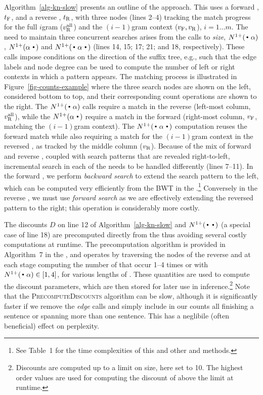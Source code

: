 Algorithm~\ref{alg-kn-slow} presents an outline of the approach.
This uses a forward \CST, $t_{\text{F}}$, and a reverse \CST, $t_{\text{R}}$, with three \CST nodes (lines 2--4) tracking the match progress for the full $i$gram ($v_{\text{R}}^{\text{all}}$) and the $(i-1)$gram context ($v_{\text{F}}, v_{\text{R}}$), $i=1 \ldots m$.
The need to maintain three concurrent searches arises from the calls to \emph{size}, $\nlplus{\dotpat}$, $\nlplus{\patdot}$ and $\nlplus{\dotpatdot}$ (lines 14, 15; 17; 21; and 18, respectively).
These calls impose conditions on the direction of the suffix tree, e.g., such that the edge 
labels and node degree can be used to compute the number of left or right contexts in which a pattern appears. 
The matching process is illustrated in Figure~\ref{fig-counts-example} where the three search nodes are shown on the left, considered bottom to top, and their corresponding count operations are shown to the right.
The $\nlplus{\dotpat}$ calls require a match in the reverse \CST (left-most column, $v_{\text{R}}^{\text{all}}$), while the $\nlplus{\patdot}$ require a match in the forward \CST (right-most column, $v_{\text{F}}$, matching the $(i-1)$gram context). 
The $\nlplus{\dotpatdot}$ computation reuses the forward match while also requiring a match for the $(i-1)$gram context in the reversed \CST, as tracked by the middle column ($v_{\text{R}}$).
Because of the mix of forward and reverse \CSTs, coupled with search patterns that are revealed right-to-left, incremental search in each of the \CSTs needs to be handled differently (lines 7--11).
In the forward \CST, we perform \emph{backward search} to extend the search pattern to the left, which can be computed very efficiently from the BWT in the \CSA.\footnote{See \supp Table~1 for the time complexities of this and other \CSA and \CST methods.}
Conversely in the reverse \CST, we must use \emph{forward search} as we are effectively extending the reversed pattern to the right; this operation is considerably more costly.

The discounts $D$ on line 12 of Algorithm~\ref{alg-kn-slow} and
$\nlplus{\Bigcdot\Bigcdot}$ (a special case of line 18) are precomputed directly from the \CSTs thus avoiding several costly computations at runtime. 
The precomputation algorithm is provided in Algorithm~7 in the \supp,
and operates by traversing the nodes of the reverse \CST and at each
stage computing the number of \ngrams that occur 1--4 times or with
$\nlplus{\dotpat} \in [1,4]$, for various lengths of \ngrams.
These quantities are used to compute the discount parameters, which
are then stored for later use in inference.\footnote{Discounts are computed up to a limit on \ngram size, here set to 10. The highest order values are used for computing the discount of \ngrams above the limit at runtime.}
Note that the \textsc{PrecomputeDiscounts} algorithm can be slow,
although it is significantly faster if we remove the \emph{edge} calls
and simply include in our counts all \ngrams finishing a sentence or
spanning more than one sentence.
This has a neglibile (often beneficial) effect on perplexity.

